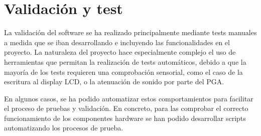 \chapter{Validación y test} \label{cap:capitulo7}


La validación del software se ha realizado principalmente mediante tests manuales a medida que se iban desarrollando e incluyendo las funcionalidades en el proyecto. La naturaleza del proyecto hace especialmente complejo el uso de herramientas que permitan la realización de tests automáticos, debido a que la mayoría de los tests requieren una comprobación sensorial, como el caso de la escritura al display \acrshort{LCD}, o la atenuación de sonido por parte del \acrshort{PGA}.


En algunos casos, se ha podido automatizar estos comportamientos para facilitar el proceso de pruebas y validación. En concreto, para las comprobar el correcto funcionamiento de los componentes hardware se han podido desarrollar scripts automatizando los procesos de prueba.


